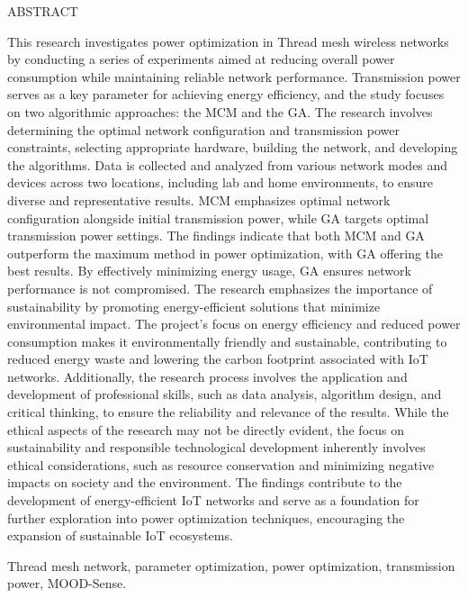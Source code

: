 \begin{center}
    ABSTRACT
\vspace{5mm}
\end{center}

This research investigates power optimization in Thread mesh wireless networks by conducting a series of experiments aimed at reducing overall power consumption while maintaining reliable network performance. Transmission power serves as a key parameter for achieving energy efficiency, and the study focuses on two algorithmic approaches: the \gls{MCM} and the \gls{GA}. The research involves determining the optimal network configuration and transmission power constraints, selecting appropriate hardware, building the network, and developing the algorithms. Data is collected and analyzed from various network modes and devices across two locations, including lab and home environments, to ensure diverse and representative results. \gls{MCM} emphasizes optimal network configuration alongside initial transmission power, while \gls{GA} targets optimal transmission power settings. The findings indicate that both \gls{MCM} and \gls{GA} outperform the maximum method in power optimization, with \gls{GA} offering the best results. By effectively minimizing energy usage, \gls{GA} ensures network performance is not compromised. The research emphasizes the importance of sustainability by promoting energy-efficient solutions that minimize environmental impact. The project's focus on energy efficiency and reduced power consumption makes it environmentally friendly and sustainable, contributing to reduced energy waste and lowering the carbon footprint associated with IoT networks. Additionally, the research process involves the application and development of professional skills, such as data analysis, algorithm design, and critical thinking, to ensure the reliability and relevance of the results. While the ethical aspects of the research may not be directly evident, the focus on sustainability and responsible technological development inherently involves ethical considerations, such as resource conservation and minimizing negative impacts on society and the environment. The findings contribute to the development of energy-efficient IoT networks and serve as a foundation for further exploration into power optimization techniques, encouraging the expansion of sustainable IoT ecosystems.

\vspace{5mm}
 Thread mesh network, parameter optimization, power optimization, transmission power, MOOD-Sense.
